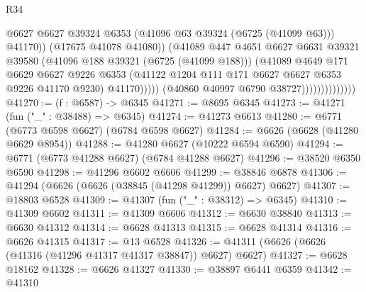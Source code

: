 \begin{lexlean}{R34}
\begin{coremodule}
                                          @6627
                                          @6627
                                          @39324
                                          @6353
                                          (@41096 @63 @39324 (@6725 (@41099 @63)))
                                          @41170))
                                      (@17675 @41078 @41080))
                                    (@41089
                                      @447
                                      @4651
                                      @6627
                                      @6631
                                      @39321
                                      @39580
                                      (@41096 @188 @39321 (@6725 (@41099 @188)))
                                      (@41089
                                        @4649
                                        @171
                                        @6629
                                        @6627
                                        @9226
                                        @6353
                                        (@41122
                                          @1204
                                          @111
                                          @171
                                          @6627
                                          @6627
                                          @6353
                                          @9226
                                          @41170
                                          @9230)
                                        @41170)))))
                              (@40860 @40997 @6790 @38727))))))))))))))
@41270 := (f : @6587) -> @6345
@41271 := @8695 @6345
@41273 := @41271 (fun ("_" : @38488) => @6345)
@41274 := @41273 @6613
@41280 := @6771 (@6773 @6598 @6627) (@6784 @6598 @6627)
@41284 := @6626 (@6628 (@41280 @6629 @8954))
@41288 := @41280 @6627 (@10222 @6594 @6590)
@41294 := @6771 (@6773 @41288 @6627) (@6784 @41288 @6627)
@41296 := @38520 @6350 @6590
@41298 := @41296 @6602 @6606
@41299 := @38846 @6878
@41306 := @41294 (@6626 (@6626 (@38845 (@41298 @41299)) @6627) @6627)
@41307 := @18803 @6528
@41309 := @41307 (fun ("_" : @38312) => @6345)
@41310 := @41309 @6602
@41311 := @41309 @6606
@41312 := @6630 @38840
@41313 := @6630 @41312
@41314 := @6628 @41313
@41315 := @6628 @41314
@41316 := @6626 @41315
@41317 := @13 @6528
@41326 := @41311 (@6626 (@6626 (@41316 (@41296 @41317 @41317 @38847)) @6627) @6627)
@41327 := @6628 @18162
@41328 := @6626 @41327
@41330 := @38897 @6441 @6359
@41342 := @41310

\end{coremodule}
\end{lexlean}
